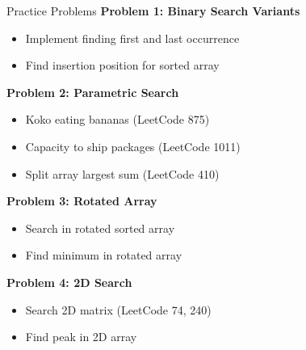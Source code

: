 \documentclass[aspectratio=169]{beamer}
\begin{document}
\begin{frame}{Practice Problems}
  \textbf{Problem 1: Binary Search Variants}
  \begin{itemize}
    \item Implement finding first and last occurrence
    \item Find insertion position for sorted array
  \end{itemize}

  \vspace{0.2cm}
  \textbf{Problem 2: Parametric Search}
  \begin{itemize}
    \item Koko eating bananas (LeetCode 875)
    \item Capacity to ship packages (LeetCode 1011)
    \item Split array largest sum (LeetCode 410)
  \end{itemize}

  \vspace{0.2cm}
  \textbf{Problem 3: Rotated Array}
  \begin{itemize}
    \item Search in rotated sorted array
    \item Find minimum in rotated array
  \end{itemize}

  \vspace{0.2cm}
  \textbf{Problem 4: 2D Search}
  \begin{itemize}
    \item Search 2D matrix (LeetCode 74, 240)
    \item Find peak in 2D array
  \end{itemize}
\end{frame}
\end{document}
